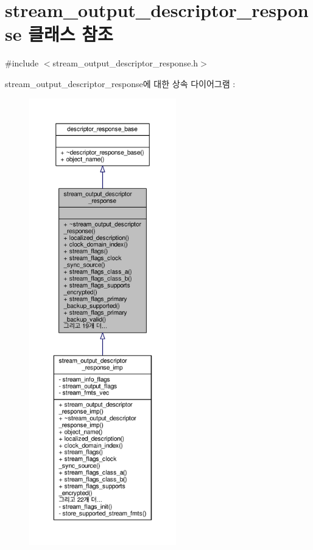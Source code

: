 \hypertarget{classavdecc__lib_1_1stream__output__descriptor__response}{}\section{stream\+\_\+output\+\_\+descriptor\+\_\+response 클래스 참조}
\label{classavdecc__lib_1_1stream__output__descriptor__response}


{\ttfamily \#include $<$stream\+\_\+output\+\_\+descriptor\+\_\+response.\+h$>$}



stream\+\_\+output\+\_\+descriptor\+\_\+response에 대한 상속 다이어그램 \+: 
\nopagebreak
\begin{figure}[H]
\begin{center}
\leavevmode
\includegraphics[height=550pt]{classavdecc__lib_1_1stream__output__descriptor__response__inherit__graph}
\end{center}
\end{figure}


